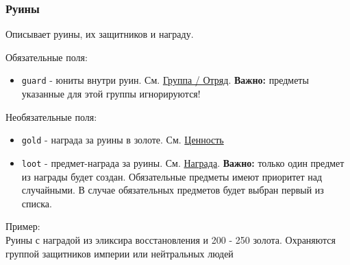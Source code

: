 \subsubsection{Руины}
\label{ruin}
Описывает руины, их защитников и награду.

Обязательные поля:
\begin{itemize}
\item \texttt{guard} - юниты внутри руин. См. \hyperref[group]{Группа / Отряд}. \textbf{Важно:} предметы указанные для этой группы игнорируются!
\end{itemize}

Необязательные поля:
\begin{itemize}
\item \texttt{gold} - награда за руины в золоте. См. \hyperref[value]{Ценность}
\item \texttt{loot} - предмет-награда за руины. См. \hyperref[loot]{Награда}. \textbf{Важно:} только один предмет из награды будет создан. Обязательные предметы имеют приоритет над случайными. В случае обязательных предметов будет выбран первый из списка.
\end{itemize}

Пример:\\
Руины с наградой из эликсира восстановления и 200 - 250 золота.
Охраняются группой защитников империи или нейтральных людей

\begin{figure}[H]

\end{figure}